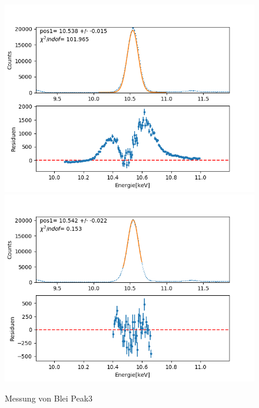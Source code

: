 \documentclass[12pt,a4paper]{article}
\begin{document}
\begin{figure}[H]
\centering
\includegraphics[scale=0.49]{Bilder/roentgen_spektren/blei/pb3_1.png}
\includegraphics[scale=0.49]{Bilder/roentgen_spektren/blei/pb3_2.png}
\caption{Messung von Blei Peak3}
\end{figure}
\end{document}
